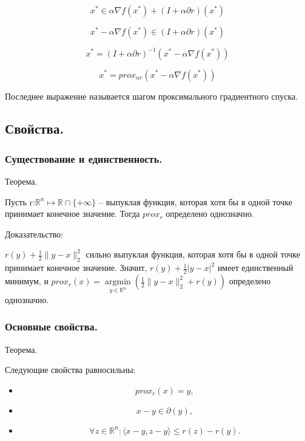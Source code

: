 \begin{equation}
    x^*\in\alpha\nabla f(x^*)+(I+\alpha\partial r)(x^*)
\end{equation}

\begin{equation}
    x^*-\alpha\nabla f(x^*)\in(I+\alpha\partial r)(x^*)
\end{equation}

\begin{equation}
    x^*=(I+\alpha\partial r)^{-1}(x^*-\alpha\nabla f(x^*))
\end{equation}

\begin{equation}
    x^*=prox_{\alpha r}(x^*-\alpha\nabla f(x^*))
\end{equation}

Последнее выражение называется шагом проксимального градиентного спуска.

\subsection*{Свойства.}

\subsubsection*{Существование и единственность.}

Теорема.

Пусть r:$\mathbb{R}^n\mapsto \mathbb{R}\cap\{+\infty\}$ -- выпуклая функция, которая хотя бы в одной точке принимает конечное значение.
Тогда $prox_r$ определено однозначно.

Доказательство:

$r(y)+\frac12\|y-x\|_2^2$ сильно выпуклая функция, которая хотя бы в одной точке принимает конечное значение. Значит, $r(y)+\frac12|y-x|^2$ имеет единственный минимум, и $prox_r(x)=\mathop{argmin}\limits_{y\in\mathbb{R}^n}\left(\frac12\|y-x\|_2^2+r(y)\right)$ определено однозначно.

\subsubsection*{Основные свойства.}

Теорема.

Следующие свойства равносильны:

\begin{itemize}
\item\[prox_r(x)=y,\]
\item\[x-y\in\partial(y),\]
\item\[\forall z\in\mathbb{R}^n:\langle x-y,z-y\rangle\leq r(z)-r(y).\]
\end{itemize}

